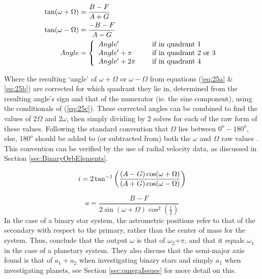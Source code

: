 \documentclass[12pt,preprint]{aastex}
\begin{document}
\begin{subequations}
\begin{align}\label{eq:25a}
\tan(\omega+\Omega)& = \frac{B-F}{A+G} \\
\label{eq:25b}
\tan(\omega-\Omega)& = \frac{-B-F}{A-G}\\
\label{eq:25c}
Angle& = \left\{ \begin{array}{l l l} Angle^{\prime}& \quad \text{ if in quadrant 1}\\ Angle^{\prime} + \pi& \quad \text{ if in quadrant 2 or 3}\\ Angle^{\prime} + 2\pi& \quad \text{ if in quadrant 4}  \end{array} \right.
\end{align}
\end{subequations}

Where the resulting `angle' of $\omega+\Omega$ or $ \omega-\Omega$ from equations (\ref{eq:25a} \& \ref{eq:25b}) are corrected for which quadrant they lie in, determined from the resulting angle's sign and that of the numerator (ie. the sine component), using the conditionals of (\ref{eq:25c}).  These corrected angles can be combined to find the values of 2$\Omega$ and 2$\omega$, then simply dividing by 2 solves for each of the raw form of these values.  Following the standard convention that $\Omega$ lies between $0^{o}-180^{o}$, else, $180^{o}$ should be added to (or subtracted from) both the $\omega$ and $\Omega$ raw values \citep{aitken}.  This convention can be verified by the use of radial velocity data, as discussed in Section \ref{sec:BinaryOrbElements}.

\begin{equation}\label{eq:26}
i = 2\tan^{-1}\bigg(\frac{(A-G)\cos(\omega+\Omega)}{(A+G)\cos(\omega-\Omega)}  \bigg)\\
\end{equation}

\begin{equation}\label{eq:27}
a = \frac{B-F}{2\sin(\omega+\Omega)\cos^2(\frac{i}{2})}
\end{equation}
In the case of a binary star system, the astrometric positions refer to that of the secondary with respect to the primary, rather than the center of mass for the system.  Thus, \citet{Shulze-Hartung} conclude that the output $\omega$ is that of $\omega_2$+$\pi$, and that it equals $\omega_1$ in the case of a planetary system.  They also discuss that the semi-major axis found is that of $a_1+a_2$ when investigating binary stars and simply $a_1$ when investigating planets, see Section \ref{sec:omegaIssues} for more detail on this.
\end{document}
